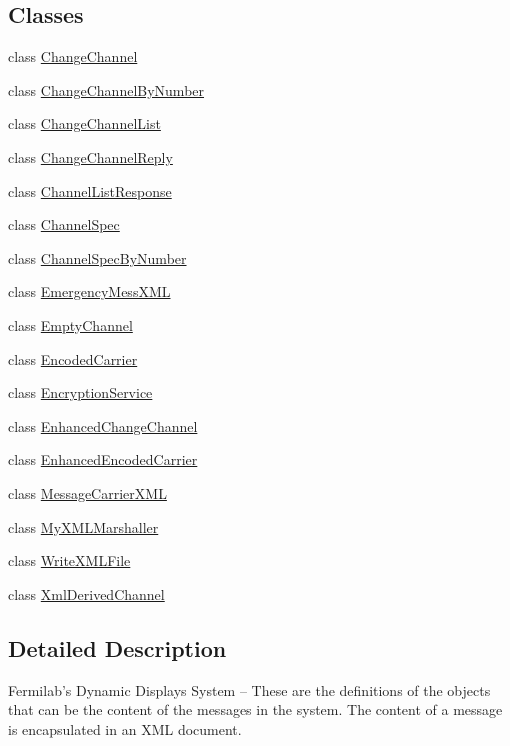 \subsection*{Classes}
\begin{DoxyCompactItemize}
\item 
class \hyperlink{classgov_1_1fnal_1_1ppd_1_1dd_1_1xml_1_1ChangeChannel}{Change\-Channel}
\item 
class \hyperlink{classgov_1_1fnal_1_1ppd_1_1dd_1_1xml_1_1ChangeChannelByNumber}{Change\-Channel\-By\-Number}
\item 
class \hyperlink{classgov_1_1fnal_1_1ppd_1_1dd_1_1xml_1_1ChangeChannelList}{Change\-Channel\-List}
\item 
class \hyperlink{classgov_1_1fnal_1_1ppd_1_1dd_1_1xml_1_1ChangeChannelReply}{Change\-Channel\-Reply}
\item 
class \hyperlink{classgov_1_1fnal_1_1ppd_1_1dd_1_1xml_1_1ChannelListResponse}{Channel\-List\-Response}
\item 
class \hyperlink{classgov_1_1fnal_1_1ppd_1_1dd_1_1xml_1_1ChannelSpec}{Channel\-Spec}
\item 
class \hyperlink{classgov_1_1fnal_1_1ppd_1_1dd_1_1xml_1_1ChannelSpecByNumber}{Channel\-Spec\-By\-Number}
\item 
class \hyperlink{classgov_1_1fnal_1_1ppd_1_1dd_1_1xml_1_1EmergencyMessXML}{Emergency\-Mess\-X\-M\-L}
\item 
class \hyperlink{classgov_1_1fnal_1_1ppd_1_1dd_1_1xml_1_1EmptyChannel}{Empty\-Channel}
\item 
class \hyperlink{classgov_1_1fnal_1_1ppd_1_1dd_1_1xml_1_1EncodedCarrier}{Encoded\-Carrier}
\item 
class \hyperlink{classgov_1_1fnal_1_1ppd_1_1dd_1_1xml_1_1EncryptionService}{Encryption\-Service}
\item 
class \hyperlink{classgov_1_1fnal_1_1ppd_1_1dd_1_1xml_1_1EnhancedChangeChannel}{Enhanced\-Change\-Channel}
\item 
class \hyperlink{classgov_1_1fnal_1_1ppd_1_1dd_1_1xml_1_1EnhancedEncodedCarrier}{Enhanced\-Encoded\-Carrier}
\item 
class \hyperlink{classgov_1_1fnal_1_1ppd_1_1dd_1_1xml_1_1MessageCarrierXML}{Message\-Carrier\-X\-M\-L}
\item 
class \hyperlink{classgov_1_1fnal_1_1ppd_1_1dd_1_1xml_1_1MyXMLMarshaller}{My\-X\-M\-L\-Marshaller}
\item 
class \hyperlink{classgov_1_1fnal_1_1ppd_1_1dd_1_1xml_1_1WriteXMLFile}{Write\-X\-M\-L\-File}
\item 
class \hyperlink{classgov_1_1fnal_1_1ppd_1_1dd_1_1xml_1_1XmlDerivedChannel}{Xml\-Derived\-Channel}
\end{DoxyCompactItemize}


\subsection{Detailed Description}
Fermilab's Dynamic Displays System -- These are the definitions of the objects that can be the content of the messages in the system. The content of a message is encapsulated in an X\-M\-L document.